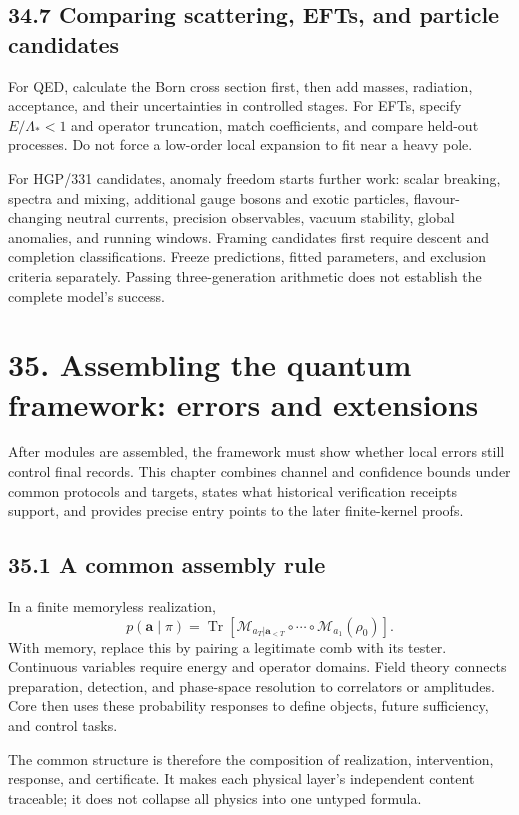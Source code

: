 \documentclass[
  11pt,
  oneside]{book}
\begin{document}
\section{34.7 Comparing scattering, EFTs, and particle candidates}

For QED, calculate the Born cross section first, then add masses,
radiation, acceptance, and their uncertainties in controlled stages. For
EFTs, specify \(E/\Lambda_*<1\) and operator truncation, match
coefficients, and compare held-out processes. Do not force a low-order
local expansion to fit near a heavy pole.

For HGP/331 candidates, anomaly freedom starts further work: scalar
breaking, spectra and mixing, additional gauge bosons and exotic
particles, flavour-changing neutral currents, precision observables,
vacuum stability, global anomalies, and running windows. Framing
candidates first require descent and completion classifications. Freeze
predictions, fitted parameters, and exclusion criteria separately.
Passing three-generation arithmetic does not establish the complete
model's success.

\chapter{35. Assembling the quantum framework: errors and
extensions}\label{ch-35}

After modules are assembled, the framework must show whether local
errors still control final records. This chapter combines channel and
confidence bounds under common protocols and targets, states what
historical verification receipts support, and provides precise entry
points to the later finite-kernel proofs.

\section{35.1 A common assembly rule}

In a finite memoryless realization, \[
p(\mathbf a\mid\pi)=
\operatorname{Tr}\!\left[
\mathcal M_{a_T|\mathbf a_{<T}}\circ\cdots\circ
\mathcal M_{a_1}(\rho_0)\right].
\] With memory, replace this by pairing a legitimate comb with its
tester. Continuous variables require energy and operator domains. Field
theory connects preparation, detection, and phase-space resolution to
correlators or amplitudes. Core then uses these probability responses to
define objects, future sufficiency, and control tasks.

The common structure is therefore the composition of realization,
intervention, response, and certificate. It makes each physical layer's
independent content traceable; it does not collapse all physics into one
untyped formula.
\end{document}
